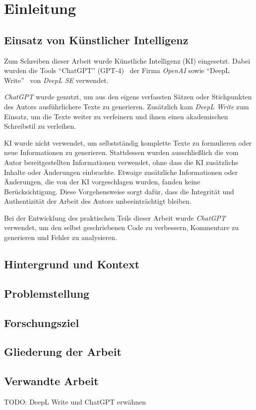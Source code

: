 \chapter{Einleitung}
\section{Einsatz von Künstlicher Intelligenz}
Zum Schreiben dieser Arbeit wurde Künstliche Intelligenz (KI) eingesetzt.
Dabei wurden die Tools \enquote{ChatGPT} (GPT-4)~\cite{openai_chatgpt_nodate} der Firma \emph{OpenAI} sowie \enquote{DeepL Write}~\cite{deepl_se_deepl_nodate} von \emph{DeepL SE} verwendet.

\emph{ChatGPT} wurde genutzt, um aus den eigens verfassten Sätzen oder Stichpunkten des Autors ausführlichere Texte zu generieren.
Zusätzlich kam \emph{DeepL Write} zum Einsatz, um die Texte weiter zu verfeinern und ihnen einen akademischen Schreibstil zu verleihen.

KI wurde nicht verwendet, um selbstständig komplette Texte zu formulieren oder neue Informationen zu generieren.
Stattdessen wurden ausschließlich die vom Autor bereitgestellten Informationen verwendet, ohne dass die KI zusätzliche Inhalte oder Änderungen einbrachte.
Etwaige zusätzliche Informationen oder Änderungen, die von der KI vorgeschlagen wurden, fanden keine Berücksichtigung.
Diese Vorgehensweise sorgt dafür, dass die Integrität und Authentizität der Arbeit des Autors unbeeinträchtigt bleiben.

Bei der Entwicklung des praktischen Teils dieser Arbeit wurde \emph{ChatGPT} verwendet, um den selbst geschriebenen Code zu verbessern, Kommentare zu generieren und Fehler zu analysieren.
\section{Hintergrund und Kontext}
\section{Problemstellung}
\section{Forschungsziel}
\section{Gliederung der Arbeit}
\section{Verwandte Arbeit}

 TODO: DeepL Write und ChatGPT erwähnen
 